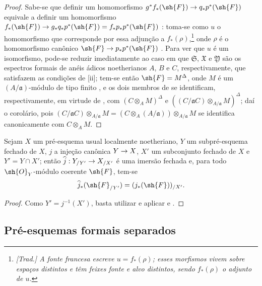 \documentclass[oneside]{amsart}
\makeatletter
\newcommand{\ega@arrow}[2]{\mathchoice{#1}{#2}{#2}{#2}}
\renewcommand{\to}{\ega@arrow{\longrightarrow}{\rightarrow}}
\newcommand{\oldpage}[2][]{{\marginnote{\normalfont\textbf{#1}~|~#2}}\ignorespaces}
\let\EGAOriginalLabel\label
\renewcommand{\label}[1]{\phantomsection\EGAOriginalLabel{#1}}
\makeatother
\begin{document}
\begin{proof}
Sabe-se que definir um homomorfismo $g^*f_*(\sh{F}) \to q_*p^*(\sh{F})$ equivale a definir um homomorfismo $f_*(\sh{F}) \to g_*q_*p^*(\sh{F}) = f_*p_*p^*(\sh{F})$ :
toma-se como $u$ o homomorfismo que corresponde por essa adjunção a $f_*(\rho)$,\footnote{\emph{[Trad.] A fonte francesa escreve $u=f_*(\rho)$; esses morfismos vivem sobre espaços distintos e têm feixes fonte e alvo distintos, sendo $f_*(\rho)$ o adjunto de $u$.}} onde $\rho$ é o homomorfismo canônico $\sh{F}\to p_*p^*(\sh{F})$ .
Para ver que $u$ é um isomorfismo, pode-se reduzir imediatamente ao caso em que $\mathfrak{S}$, $\mathfrak{X}$ e $\mathfrak{Y}$ são os espectros formais de anéis ádicos noetherianos $A$, $B$ e $C$, respectivamente, que satisfazem as condições de [ii];
tem-se então $\sh{F}=M^\Delta$, onde $M$ é um $(A/\mathfrak{a})$-módulo de tipo finito , e os dois membros de  se identificam, respectivamente, em virtude de , com $(C\otimes_A M)^\Delta$ e $((C/\mathfrak{a}C)\otimes_{A/\mathfrak{a}}M)^\Delta$; daí o corolário, pois $(C/\mathfrak{a}C)\otimes_{A/\mathfrak{a}}M = (C\otimes_A(A/\mathfrak{a}))\otimes_{A/\mathfrak{a}}M$ se identifica canonicamente com $C\otimes_A M$.
\end{proof}

\oldpage[I]{212}
\begin{corollary}[10.14.7]
\label{I.10.14.7}
Sejam $X$ um pré-esquema usual localmente noetheriano, $Y$ um subpré-esquema fechado de $X$, $j$ a injeção canônica $Y\to X$, $X'$ um subconjunto fechado de $X$ e $Y'=Y\cap X'$;
então $\widehat{j}:Y_{/Y'}\to X_{/X'}$ é uma imersão fechada e, para todo $\sh{O}_Y$-módulo coerente $\sh{F}$, tem-se
\[
    \widehat{j}_*(\sh{F}_{/Y'}) = (j_*(\sh{F}))_{/X'}.
\]
\end{corollary}

\begin{proof}
Como $Y'=j^{-1}(X')$, basta utilizar  e aplicar  e .
\end{proof}

\subsection{Pré-esquemas formais separados}
\label{subsection:I.10.15}
\end{document}
